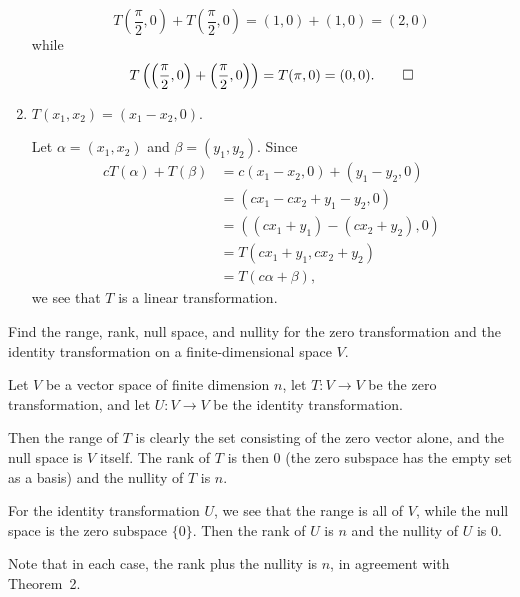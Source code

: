 \begin{enumerate}
\begin{solution}
\begin{equation*}
      T\left(\frac\pi2, 0\right) + T\left(\frac\pi2, 0\right)
      = (1, 0) + (1, 0) = (2, 0)
    \end{equation*}
    while
    \begin{equation*}
      T\left(\left(\frac\pi2, 0\right) + \left(\frac\pi2, 0\right)\right)
      = T(\pi, 0) = (0, 0). \qedhere
    \end{equation*}
  \end{solution}
\item $T(x_1, x_2) = (x_1 - x_2, 0)$.
  \begin{solution}
    Let $\alpha = (x_1, x_2)$ and $\beta = (y_1, y_2)$. Since
    \begin{align*}
      cT(\alpha) + T(\beta)
      &= c(x_1 - x_2, 0) + (y_1 - y_2, 0) \\
      &= (cx_1 - cx_2 + y_1 - y_2, 0) \\
      &= ((cx_1 + y_1) - (cx_2 + y_2), 0) \\
      &= T(cx_1 + y_1, cx_2 + y_2) \\
      &= T(c\alpha + \beta),
    \end{align*}
    we see that $T$ is a linear transformation.
  \end{solution}
\end{enumerate}

 Find the range, rank, null space, and nullity for the zero
transformation and the identity transformation on a finite-dimensional
space $V$.
\begin{solution}
  Let $V$ be a vector space of finite dimension $n$, let
  $T\colon V\to V$ be the zero transformation, and let
  $U\colon V\to V$ be the identity transformation.

  Then the range of $T$ is clearly the set consisting of the zero
  vector alone, and the null space is $V$ itself. The rank of $T$ is
  then $0$ (the zero subspace has the empty set as a basis) and the
  nullity of $T$ is $n$.

  For the identity transformation $U$, we see that the range is all of
  $V$, while the null space is the zero subspace $\{0\}$. Then the
  rank of $U$ is $n$ and the nullity of $U$ is $0$.

  Note that in each case, the rank plus the nullity is $n$, in
  agreement with Theorem~2.
\end{solution}

